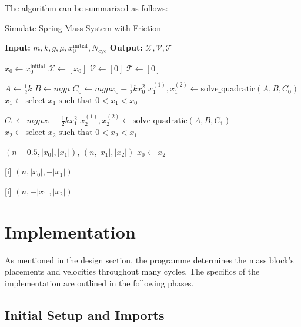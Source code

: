 \documentclass[12pt, a4paper, oneside]{report}
\begin{document}
The algorithm can be summarized as follows:

\begin{algorithm}
	\caption{Simulate Spring-Mass System with Friction}
	\begin{algorithmic}[1]
		\State \textbf{Input:} \(m, k, g, \mu, x_0^{\text{initial}}, N_{\text{cyc}}\)
		\State \textbf{Output:} \(\mathcal{X}, \mathcal{V}, \mathcal{T}\)

		\State \( x_0 \gets x_0^{\text{initial}} \)
		\State \(\mathcal{X} \gets [x_0]\)
		\State \(\mathcal{V} \gets [0]\)
		\State \(\mathcal{T} \gets [0]\)

		\State \( A \gets \frac{1}{2} k \)
		\State \( B \gets m g \mu \)
		\State \( C_0 \gets m g \mu x_0 - \frac{1}{2} k x_0^2 \)
		\State \( x_1^{(1)}, x_1^{(2)} \gets \text{solve\_quadratic}(A, B, C_0) \)
		\State \( x_1 \gets \text{select } x_1 \text{ such that } 0 < x_1 < x_0 \)

		\State \( C_1 \gets m g \mu x_1 - \frac{1}{2} k x_1^2 \)
		\State \( x_2^{(1)}, x_2^{(2)} \gets \text{solve\_quadratic}(A, B, C_1) \)
		\State \( x_2 \gets \text{select } x_2 \text{ such that } 0 < x_2 < x_1 \)

		\State {} \((n - 0.5, |x_0|, |x_1|)\), \((n, |x_1|, |x_2|)\)
		\State \( x_0 \gets x_2 \)
		\EndFor

		\State {}[i]  \((n, |x_0|, -|x_1|)\)
		\EndFor

		\State {}[i]  \((n, -|x_1|, |x_2|)\)
		\EndFor

		\State {}
	\end{algorithmic}
\end{algorithm}



\section{Implementation}

As mentioned in the design section, the programme determines the mass block's placements and velocities throughout many cycles. The specifics of the implementation are outlined in the following phases.

\subsection*{Initial Setup and Imports}
\end{document}
